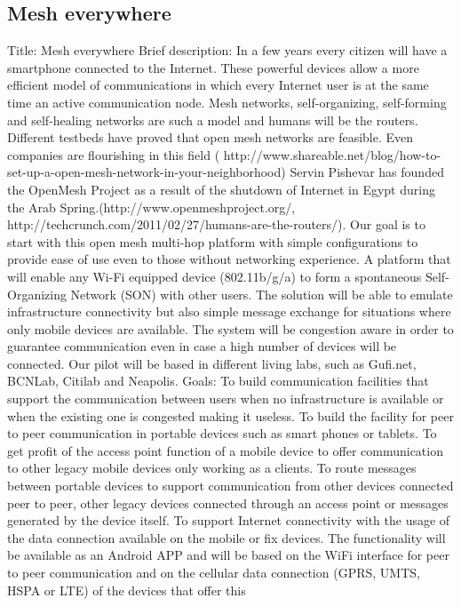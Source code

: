 \documentclass[draftclsnofoot,12pt,journal,onecolumn]{IEEEtran}
\begin{document}
\subsection{Mesh everywhere}
Title: Mesh everywhere
Brief description:
In a few years every citizen will have a smartphone connected to the
Internet. These powerful devices allow a more efficient model of
communications in which every Internet user is at the same time an active
communication node. Mesh networks, self-organizing, self-forming and
self-healing networks are such a model and humans will be the routers.
Different testbeds have proved that open mesh networks are feasible. Even
companies are flourishing in this field (
http://www.shareable.net/blog/how-to-set-up-a-open-mesh-network-in-your-neighborhood)
Servin Pishevar has founded the OpenMesh Project as a result of the shutdown
of Internet in Egypt during the Arab Spring.(http://www.openmeshproject.org/,
http://techcrunch.com/2011/02/27/humans-are-the-routers/).
Our goal is to start with this open mesh multi-hop platform with simple
configurations to provide ease of use even to those without networking
experience. A platform that will enable any Wi-Fi equipped device
(802.11b/g/a) to form a spontaneous Self-Organizing Network (SON) with other
users.
The solution will be able to emulate infrastructure connectivity but also
simple message exchange for situations where only mobile devices are
available. The system will be congestion aware in order to guarantee
communication even in case a high number of devices will be connected.
Our pilot will be based in different living labs, such as  Gufi.net, BCNLab,
Citilab and Neapolis.
Goals:
To build communication facilities that support the communication between
users when no infrastructure is available or when the existing one is
congested making it useless.
To build the facility for peer to peer communication in portable devices such
as smart phones or tablets.
To get profit of the access point function of a mobile device to offer
communication to other legacy mobile devices only working as a clients.
To route messages between portable devices to support communication from
other devices connected peer to peer, other legacy devices connected through
an access point or messages generated by the device itself.
To support Internet connectivity with the usage of the data connection
available on the mobile or fix devices.
The functionality will be available as an Android APP and will be based on
the WiFi interface for peer to peer communication and on the cellular data
connection (GPRS, UMTS, HSPA or LTE) of the devices that offer this
\end{document}
